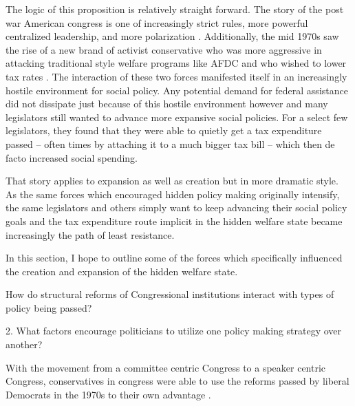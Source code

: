 \documentclass[12pt]{article}
\begin{document}
The logic of this proposition is relatively straight forward. The story of the post war American congress is one of increasingly strict rules, more powerful centralized leadership, and more polarization \citep{rohde1991, binder2003, koger2010}. Additionally, the mid 1970s saw the rise of a new brand of activist conservative who was more aggressive in attacking traditional style welfare programs like AFDC and who wished to lower tax rates \citep{hacker2007}. The interaction of these two forces manifested itself in an increasingly hostile environment for social policy. Any potential demand for federal assistance did not dissipate just because of this hostile environment however and many legislators still wanted to advance more expansive social policies. For a select few legislators, they found that they were able to quietly get a tax expenditure passed -- often times by attaching it to a much bigger tax bill -- which then de facto increased social spending. 

That story applies to expansion as well as creation but in more dramatic style. As the same forces which encouraged hidden policy making originally intensify, the same legislators and others simply want to keep advancing their social policy goals and the tax expenditure route implicit in the hidden welfare state became increasingly the path of least resistance. 

In this section, I hope to outline some of the forces which specifically influenced the creation and expansion of the hidden welfare state. 

How do structural reforms of Congressional institutions interact with types of policy being passed?

2. What factors encourage politicians to utilize one policy making strategy over another?

With the movement from a committee centric Congress to a speaker centric Congress, conservatives in congress were able to use the reforms passed by liberal Democrats in the 1970s to their own advantage \citep{zelizer2007}.
\end{document}
